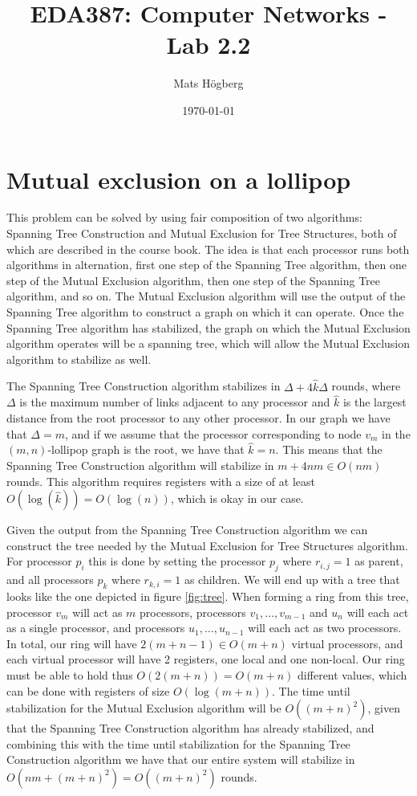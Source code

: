 \documentclass{article}
\title{EDA387: Computer Networks - Lab 2.2}
\author{Mats Högberg}
\date{\today}
\begin{document}
\maketitle

\section*{Mutual exclusion on a lollipop}

This problem can be solved by using fair composition of two algorithms: Spanning Tree Construction and Mutual Exclusion for Tree Structures, both of which are described in the course book. The idea is that each processor runs both algorithms in alternation, first one step of the Spanning Tree algorithm, then one step of the Mutual Exclusion algorithm, then one step of the Spanning Tree algorithm, and so on. The Mutual Exclusion algorithm will use the output of the Spanning Tree algorithm to construct a graph on which it can operate. Once the Spanning Tree algorithm has stabilized, the graph on which the Mutual Exclusion algorithm operates will be a spanning tree, which will allow the Mutual Exclusion algorithm to stabilize as well.

The Spanning Tree Construction algorithm stabilizes in $\Delta + 4 \hat{k} \Delta$ rounds, where $\Delta$ is the maximum number of links adjacent to any processor and $\hat{k}$ is the largest distance from the root processor to any other processor. In our graph we have that $\Delta = m$, and if we assume that the processor corresponding to node $v_m$ in the $(m,n)$-lollipop graph is the root, we have that $\hat{k} = n$. This means that the Spanning Tree Construction algorithm will stabilize in $m + 4nm \in O(nm)$ rounds. This algorithm requires registers with a size of at least $O(\log(\hat{k})) = O(\log(n))$, which is okay in our case.

Given the output from the Spanning Tree Construction algorithm we can construct the tree needed by the Mutual Exclusion for Tree Structures algorithm. For processor $p_i$ this is done by setting the processor $p_j$ where $r_{i,j} = 1$ as parent, and all processors $p_k$ where $r_{k, i} = 1$ as children. We will end up with a tree that looks like the one depicted in figure \ref{fig:tree}. When forming a ring from this tree, processor $v_m$ will act as $m$ processors, processors $v_1, \ldots, v_{m-1}$ and $u_n$ will each act as a single processor, and processors $u_1, \ldots, u_{n-1}$ will each act as two processors. In total, our ring will have $2(m + n - 1) \in O(m+n)$ virtual processors, and each virtual processor will have 2 registers, one local and one non-local. Our ring must be able to hold thus $O(2(m+n)) = O(m+n)$ different values, which can be done with registers of size $O(\log(m+n))$. The time until stabilization for the Mutual Exclusion algorithm will be $O((m+n)^2)$, given that the Spanning Tree Construction algorithm has already stabilized, and combining this with the time until stabilization for the Spanning Tree Construction algorithm we have that our entire system will stabilize in $O(nm + (m+n)^2) = O((m+n)^2)$ rounds.
\end{document}
